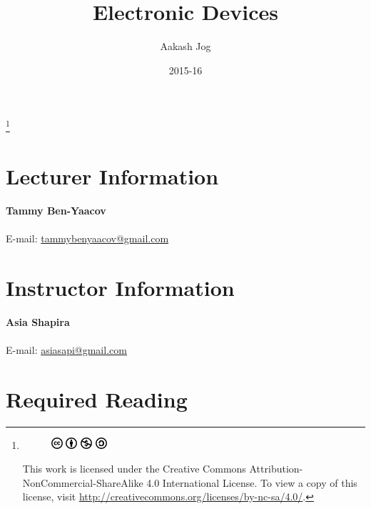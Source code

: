 \documentclass[titlepage, fleqn, a4paper, 12pt, twoside]{article}
\title{Electronic Devices}
\author{Aakash Jog}
\date{2015-16}
\theoremstyle{definition}
\theoremstyle{theorem}
\newcommand\blfootnote[1]{%
	\begingroup
	\renewcommand\thefootnote{}\footnote{#1}%
	\addtocounter{footnote}{-1}%
	\endgroup
}
\begin{document}
\begin{titlepage}
\maketitle
\end{titlepage}
\restoregeometry

\blfootnote
{	
	\begin{figure}[H]
		\includegraphics[height = 12pt]{cc.pdf}
		\includegraphics[height = 12pt]{by.pdf}
		\includegraphics[height = 12pt]{nc.pdf}
		\includegraphics[height = 12pt]{sa.pdf}
	\end{figure}
	This work is licensed under the Creative Commons Attribution-NonCommercial-ShareAlike 4.0 International License. To view a copy of this license, visit \url{http://creativecommons.org/licenses/by-nc-sa/4.0/}.
} %

\tableofcontents

\clearpage
\listoffigures

\clearpage
\section{Lecturer Information}

\textbf{Tammy Ben-Yaacov}\\
~\\
E-mail: \href{mailto:tammybenyaacov@gmail.com}{tammybenyaacov@gmail.com}\\

\section{Instructor Information}

\textbf{Asia Shapira}\\
~\\
E-mail: \href{asiasapi@gmail.com}{asiasapi@gmail.com}

\section{Required Reading}
\end{document}
